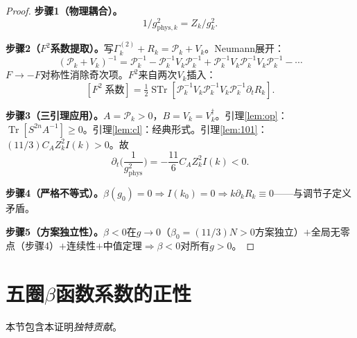 \documentclass[12pt,a4paper]{article}
\theoremstyle{plain}
\theoremstyle{definition}
\theoremstyle{remark}
\begin{document}
\begin{proof}
\textbf{步骤1（物理耦合）。}
\begin{equation}\label{eq:gphys}
1/g_{\mathrm{phys},k}^2 = Z_k/g_k^2.
\end{equation}

\textbf{步骤2（$F^2$系数提取）。}写$\Gamma_k^{(2)}+R_k=\mathcal{P}_k+V_k$。Neumann展开：
\begin{equation}\label{eq:Neumann}
(\mathcal{P}_k+V_k)^{-1} = \mathcal{P}_k^{-1}-\mathcal{P}_k^{-1}V_k\mathcal{P}_k^{-1}+\mathcal{P}_k^{-1}V_k\mathcal{P}_k^{-1}V_k\mathcal{P}_k^{-1}-\cdots
\end{equation}
$F\to -F$对称性消除奇次项。$F^2$来自两次$V_k$插入：
\begin{equation}\label{eq:F2trace}
[F^2\;\text{系数}] = \tfrac{1}{2}\operatorname{STr}[\mathcal{P}_k^{-1}V_k\mathcal{P}_k^{-1}V_k\mathcal{P}_k^{-1}\partial_tR_k].
\end{equation}

\textbf{步骤3（三引理应用）。}$A=\mathcal{P}_k>0$，$B=V_k=V_k^\dagger$。引理\ref{lem:op}：$\operatorname{Tr}[S^{2n}A^{-1}]\geq 0$。引理\ref{lem:cl}：经典形式。引理\ref{lem:101}：$(11/3)C_AZ_k^2I(k)>0$。故
\begin{equation}\label{eq:betaflow}
\partial_t\!\Big(\frac{1}{g_{\mathrm{phys}}^2}\Big) = -\frac{11}{6}C_AZ_k^2I(k) < 0.
\end{equation}

\textbf{步骤4（严格不等式）。}$\beta(g_0)=0\Rightarrow I(k_0)=0\Rightarrow k\partial_kR_k\equiv 0$——与调节子定义矛盾。

\textbf{步骤5（方案独立性）。}$\beta<0$在$g\to 0$（$\beta_0=(11/3)N>0$方案独立）$+$全局无零点（步骤4）$+$连续性$+$中值定理$\Rightarrow\beta<0$对所有$g>0$。
\end{proof}


\section{五圈$\beta$函数系数的正性}\label{sec:fiveloop}
本节包含本证明\emph{独特贡献}。
\end{document}

